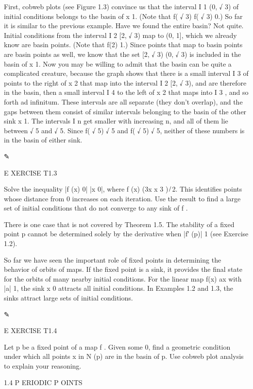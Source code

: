 First, cobweb plots (see Figure 1.3) convince us that the interval I 1  (0, √ 3) of initial conditions 
belongs to the basin of x  1. (Note that f( √ 3)  f( √ 3)  0.) So far it is similar to the previous 
example. Have we found the entire basin? Not quite. Initial conditions from the interval I 2  [2,  √ 3) 
map to (0, 1], which we already know are basin points. (Note that f(2)  1.) Since points that map to basin 
points are basin points as well, we know that the set [2,  √ 3)  (0, √ 3) is included in the basin of x  
1. Now you may be willing to admit that the basin can be quite a complicated creature, because the graph 
shows that there is a small interval I 3 of points to the right of x  2 that map into the interval I 2  [2,  
√ 3), and are therefore in the basin, then a small interval I 4 to the left of x  2 that maps into I 3 , 
and so forth ad inﬁnitum. These intervals are all separate (they don’t overlap), and the gaps between them 
consist of similar intervals belonging to the basin of the other sink x  1. The intervals I n get smaller 
with increasing n, and all of them lie between  √ 5 and √ 5. Since f( √ 5)   √ 5 and f( √ 5)  √ 5, 
neither of these numbers is in the basin of either sink.

✎

E XERCISE T1.3

Solve the inequality |f (x)  0| 
 |x  0|, where f (x)  (3x  x 3 ) ̸ 2. This identiﬁes points whose distance from 0 increases on each 
iteration. Use the result to ﬁnd a large set of initial conditions that do not converge to any sink of f .

There is one case that is not covered by Theorem 1.5. The stability of a ﬁxed point p cannot be determined 
solely by the derivative when |f′ (p)|  1 (see Exercise 1.2).


So far we have seen the important role of ﬁxed points in determining the behavior of orbits of maps. If 
the ﬁxed point is a sink, it provides the ﬁnal state for the orbits of many nearby initial conditions. 
For the linear map f(x)  ax with |a|  1, the sink x  0 attracts all initial conditions. In Examples 1.2 and 
1.3, the sinks attract large sets of initial conditions.

✎

E XERCISE T1.4

Let p be a ﬁxed point of a map f . Given some  
 0, ﬁnd a geometric condition under which all points x in N  (p) are in the basin of p. Use cobweb plot 
analysis to explain your reasoning.

1.4 P ERIODIC P OINTS

